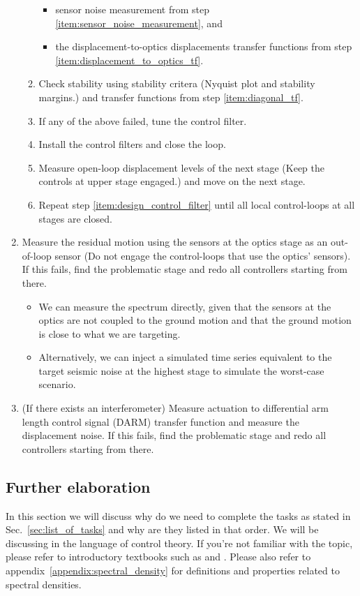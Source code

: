 \begin{enumerate}
\begin{enumerate}
\begin{itemize}
			\item sensor noise measurement from step \ref{item:sensor_noise_measurement}, and
			\item the displacement-to-optics displacements transfer functions from step \ref{item:displacement_to_optics_tf}.
		\end{itemize} 
		\item Check stability using stability critera (Nyquist plot and stability margins.) and transfer functions from step \ref{item:diagonal_tf}.
		\item If any of the above failed, tune the control filter.
		\item Install the control filters and close the loop.
		\item Measure open-loop displacement levels of the next stage (Keep the controls at upper stage engaged.) and move on the next stage. \label{item:open_loop_displacement_levels}
		\item Repeat step \ref{item:design_control_filter} until all local control-loops at all stages are closed.
	\end{enumerate}
	\item Measure the residual motion using the sensors at the optics stage as an out-of-loop sensor (Do not engage the control-loops that use the optics' sensors). If this fails, find the problematic stage and redo all controllers starting from there.
		\begin{itemize}
			\item We can measure the spectrum directly, given that the sensors at the optics are not coupled to the ground motion and that the ground motion is close to what we are targeting.
			\item Alternatively, we can inject a simulated time series equivalent to the target seismic noise at the highest stage to simulate the worst-case scenario.
		\end{itemize}
	\item (If there exists an interferometer) Measure actuation to differential arm length control signal (DARM) transfer function and measure the displacement noise. If this fails, find the problematic stage and redo all controllers starting from there.
\end{enumerate}

\subsection{Further elaboration}
In this section we will discuss why do we need to complete the tasks as stated in Sec.~\ref{sec:list_of_tasks} and why are they listed in that order.
We will be discussing in the language of control theory.
If you're not familiar with the topic, please refer to introductory textbooks such as \cite{modern_control_engineering} and \cite{control_engineering}. Please also refer to appendix~\ref{appendix:spectral_density} for definitions and properties related to spectral densities.

